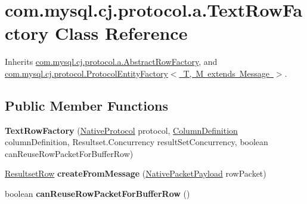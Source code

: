 \hypertarget{classcom_1_1mysql_1_1cj_1_1protocol_1_1a_1_1_text_row_factory}{}\section{com.\+mysql.\+cj.\+protocol.\+a.\+Text\+Row\+Factory Class Reference}
\label{classcom_1_1mysql_1_1cj_1_1protocol_1_1a_1_1_text_row_factory}


Inherits \mbox{\hyperlink{classcom_1_1mysql_1_1cj_1_1protocol_1_1a_1_1_abstract_row_factory}{com.\+mysql.\+cj.\+protocol.\+a.\+Abstract\+Row\+Factory}}, and \mbox{\hyperlink{interfacecom_1_1mysql_1_1cj_1_1protocol_1_1_protocol_entity_factory}{com.\+mysql.\+cj.\+protocol.\+Protocol\+Entity\+Factory$<$ T, M extends Message $>$}}.

\subsection*{Public Member Functions}
\begin{DoxyCompactItemize}
\item 
\mbox{\label{classcom_1_1mysql_1_1cj_1_1protocol_1_1a_1_1_text_row_factory_a0655493ffefb46e843346cc24bdc2db9}} 
{\bfseries Text\+Row\+Factory} (\mbox{\hyperlink{classcom_1_1mysql_1_1cj_1_1protocol_1_1a_1_1_native_protocol}{Native\+Protocol}} protocol, \mbox{\hyperlink{interfacecom_1_1mysql_1_1cj_1_1protocol_1_1_column_definition}{Column\+Definition}} column\+Definition, Resultset.\+Concurrency result\+Set\+Concurrency, boolean can\+Reuse\+Row\+Packet\+For\+Buffer\+Row)
\item 
\mbox{\label{classcom_1_1mysql_1_1cj_1_1protocol_1_1a_1_1_text_row_factory_abb512d21748eabdf15597e3fd8015aac}} 
\mbox{\hyperlink{interfacecom_1_1mysql_1_1cj_1_1protocol_1_1_resultset_row}{Resultset\+Row}} {\bfseries create\+From\+Message} (\mbox{\hyperlink{classcom_1_1mysql_1_1cj_1_1protocol_1_1a_1_1_native_packet_payload}{Native\+Packet\+Payload}} row\+Packet)
\item 
\mbox{\label{classcom_1_1mysql_1_1cj_1_1protocol_1_1a_1_1_text_row_factory_a330ee4eed94a0c86cf6fa3aa65ad902f}} 
boolean {\bfseries can\+Reuse\+Row\+Packet\+For\+Buffer\+Row} ()
\end{DoxyCompactItemize}
